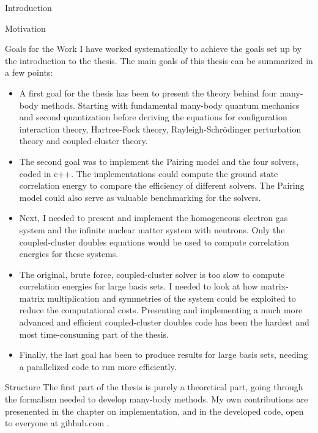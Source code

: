 \documentclass[twoside,english]{uiofysmaster}
\begin{document}
\begin{chapter}{Introduction}
\begin{subsection}{Motivation}
	\end{subsection}

	\begin{subsection}{Goals for the Work}
		I have worked systematically to achieve the goals set up by the introduction to the thesis. The main goals of this thesis can be summarized in a few points: 
		\begin{itemize}
			\item A first goal for the thesis has been to
                          present the theory behind four many-body
                          methods. Starting with fundamental many-body
                          quantum mechanics and second quantization
                          before deriving the equations for
                          configuration interaction theory, Hartree-Fock
                          theory, Rayleigh-Schr\"{o}dinger
                          perturbation theory and coupled-cluster
                          theory.
			\item The second goal was to implement the Pairing model and the four solvers, coded in c++. The implementations could compute the ground state correlation energy to compare the efficiency of different solvers. The Pairing model could also serve as valuable benchmarking for the solvers.
			\item Next, I needed to present and implement the homogeneous electron gas system and the infinite nuclear matter system with neutrons. Only the coupled-cluster doubles equations would be used to compute correlation energies for these systems. 
			\item The original, brute force, coupled-cluster solver is too slow to compute correlation energies for large basis sets. I needed to look at how matrix-matrix multiplication and symmetries of the system could be exploited to reduce the computational costs. Presenting and implementing a much more advanced and efficient coupled-cluster doubles code has been the hardest and most time-consuming part of the thesis. 
			\item Finally, the last goal has been to produce results for large basis sets, needing a parallelized code to run more efficiently. 
		\end{itemize}
	\end{subsection}

	\begin{subsection}{Structure}
		The first part of the thesis is purely a theoretical part, going through the formalism needed to develop many-body methods. My own contributions are presenented in the chapter on implementation, and in the developed code, open to everyone at gibhub.com \cite{WholmenGithub}.


\end{subsection}
\end{chapter}
\end{document}
